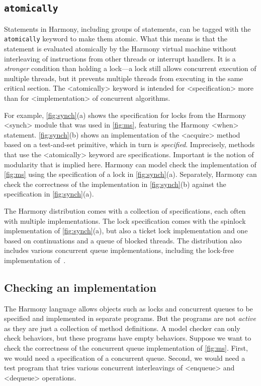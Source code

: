 \documentclass[twocolumn]{article}
\begin{document}
\subsection{\texttt{atomically}}

Statements in Harmony, including groups of statements, can be tagged with
the \texttt{atomically} keyword to make them atomic.  What this means
is that the statement is evaluated atomically by the Harmony virtual
machine without interleaving of instructions from other threads or interrupt
handlers.  It is
a \emph{stronger} condition than holding a lock---a lock still allows
concurrent execution of multiple threads, but it prevents multiple
threads from executing in the same critical section.
The <{atomically}> keyword is intended for <{specification}> more than
for <{implementation}> of concurrent algorithms.

For example, \autoref{fig:synch}(a) shows the specification for locks
from the Harmony <{synch}> module that was used in \autoref{fig:ms},
featuring the Harmony <{when}> statement.
\autoref{fig:synch}(b) shows an implementation of the <{acquire}>
method based on a test-and-set primitive, which in turn is
\emph{specified}.
Imprecisely, methods that use the <{atomically}> keyword are specifications.
Important is the notion of modularity that is implied here.
Harmony can model check the implementation of \autoref{fig:ms} using
the specification of a lock in \autoref{fig:synch}(a).
Separately, Harmony can check the correctness of the implementation in
\autoref{fig:synch}(b) against the specification in
\autoref{fig:synch}(a).

The Harmony distribution comes with a collection of specifications,
each often with multiple implementations.  The lock specification
comes with the spinlock implementation of \autoref{fig:synch}(a), but
also a ticket lock implementation and one based on continuations and
a queue of blocked threads.  The distribution also includes various concurrent
queue implementations, including the lock-free implementation
of~\cite{MS96}.

\subsection{Checking an implementation}

The Harmony language allows objects such as locks and concurrent queues
to be specified and implemented in separate programs.  But the programs
are not \emph{active} as they are just a collection of method definitions.
A model checker can only check behaviors, but these programs have empty
behaviors.
Suppose we want to check the correctness of the concurrent queue
implementation of \autoref{fig:ms}.  First, we would need a specification
of a concurrent queue.  Second, we would need a test program that tries
various concurrent interleavings of <{enqueue}> and <{dequeue}> operations.
\end{document}
